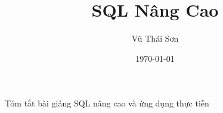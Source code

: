\documentclass[12pt]{article}
\begin{document}
\title{SQL Nâng Cao}
\author{Vũ Thái Sơn}
\date{\today}
\maketitle

\begin{center}
\large Tóm tắt bài giảng SQL nâng cao và ứng dụng thực tiễn
\end{center}





\end{document}
